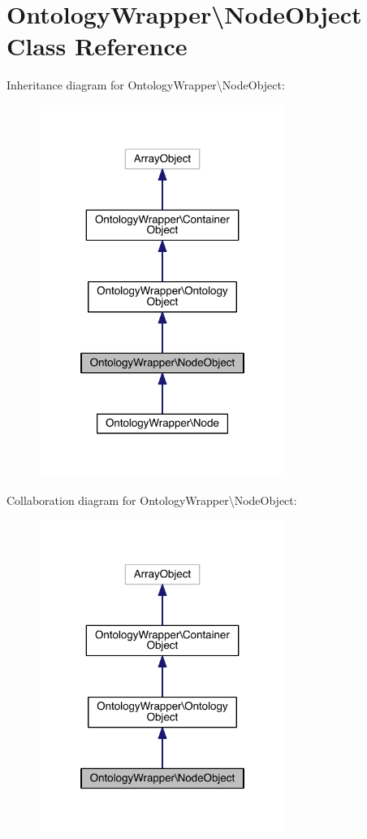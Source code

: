 \hypertarget{class_ontology_wrapper_1_1_node_object}{\section{Ontology\-Wrapper\textbackslash{}Node\-Object Class Reference}
\label{class_ontology_wrapper_1_1_node_object}
}


Inheritance diagram for Ontology\-Wrapper\textbackslash{}Node\-Object\-:\nopagebreak
\begin{figure}[H]
\begin{center}
\leavevmode
\includegraphics[width=228pt]{class_ontology_wrapper_1_1_node_object__inherit__graph}
\end{center}
\end{figure}


Collaboration diagram for Ontology\-Wrapper\textbackslash{}Node\-Object\-:\nopagebreak
\begin{figure}[H]
\begin{center}
\leavevmode
\includegraphics[width=228pt]{class_ontology_wrapper_1_1_node_object__coll__graph}
\end{center}
\end{figure}
